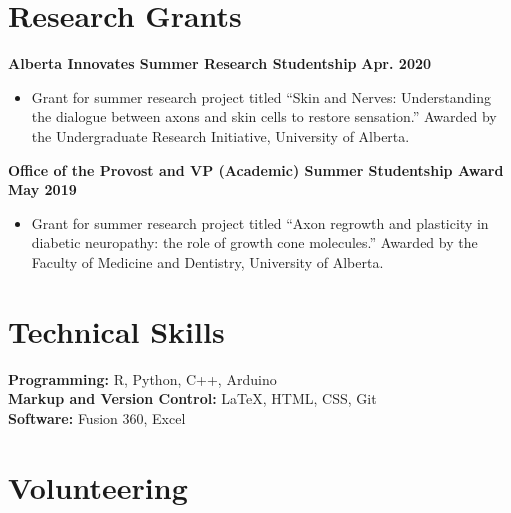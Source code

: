 \documentclass{article}
\begin{document}
\section*{\textcolor{my_colour}{Research Grants}}
\vspace{-.25em} \hrulefill \vspace{.75em}

\textbf{Alberta Innovates Summer Research Studentship} \hfill \textbf{Apr. 2020}
\begin{itemize}
    \item Grant for summer research project titled ``Skin and Nerves: Understanding the dialogue between axons and skin cells to restore sensation.'' Awarded by the Undergraduate Research Initiative, University of Alberta.
\end{itemize}
\textbf{Office of the Provost and VP (Academic) Summer Studentship Award} \hfill \textbf{May 2019}
    \begin{itemize}
        \item Grant for summer research project titled ``Axon regrowth and plasticity in diabetic neuropathy: the role of growth cone molecules.'' Awarded by the Faculty of Medicine and Dentistry, University of Alberta.
    \end{itemize}


\section*{\textcolor{my_colour}{Technical Skills}}
\vspace{-.25em} \hrulefill \vspace{.75em}

\textbf{Programming:} R, Python, C++, Arduino\\
\textbf{Markup and Version Control:} \LaTeX, HTML, CSS, Git\\
\textbf{Software:} Fusion 360, Excel


\section*{\textcolor{my_colour}{Volunteering}}
\vspace{-.25em} \hrulefill \vspace{.75em}
\end{document}
